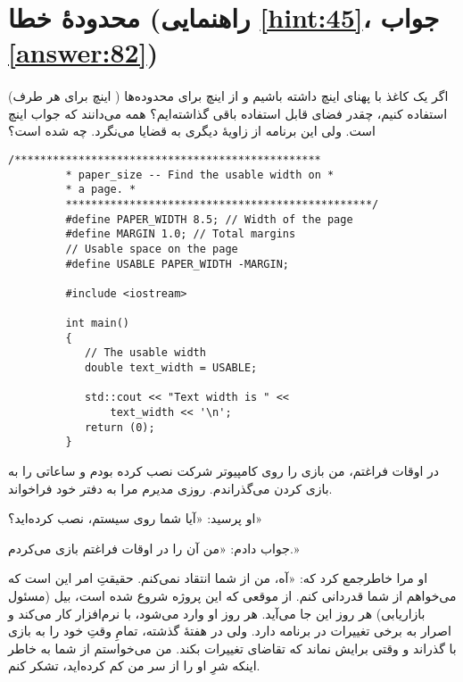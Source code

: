 \section[محدودهٔ خطا]{محدودهٔ خطا \protect{} (راهنمایی \ref{hint:45}، جواب \ref{answer:82})}
\paragraph{}\label{prog:78}
اگر یک کاغذ با پهنای  اینچ داشته باشیم و از  اینچ برای محدوده‌ها ( اینچ برای هر طرف) استفاده کنیم، چقدر فضای قابل استفاده باقی گذاشته‌ایم؟ همه می‌دانند که جواب  اینچ است. ولی این برنامه از زاویهٔ دیگری به قضایا می‌نگرد. چه شده است؟

\begin{LTR}
    \begin{lstlisting}[style=C++Style]
         /************************************************
         * paper_size -- Find the usable width on *
         * a page. *
         ************************************************/
         #define PAPER_WIDTH 8.5; // Width of the page
         #define MARGIN 1.0; // Total margins
         // Usable space on the page
         #define USABLE PAPER_WIDTH -MARGIN;

         #include <iostream>

         int main()
         {
         	// The usable width
         	double text_width = USABLE;

         	std::cout << "Text width is " <<
         		text_width << '\n';
         	return (0);
         }
    \end{lstlisting}
\end{LTR}

\begin{tcolorbox}
    در اوقات فراغتم، من بازی  را روی کامپیوتر شرکت نصب کرده بودم و ساعاتی را به بازی کردن می‌گذراندم. روزی مدیرم مرا به دفتر خود فراخواند.

    او پرسید: «آیا شما روی سیستم،  نصب کرده‌اید؟»

    جواب دادم: «من آن را در اوقات فراغتم بازی می‌کردم.»

    او مرا خاطرجمع کرد که: «آه، من از شما انتقاد نمی‌کنم. حقیقتِ امر این است که می‌خواهم از شما قدردانی کنم. از موقعی که این پروژه شروع شده است، بیل (مسئول بازاریابی) هر روز این جا می‌آید. هر روز او وارد می‌شود، با نرم‌افزار کار می‌کند و اصرار به برخی تغییرات در برنامه دارد. ولی در هفتهٔ گذشته، تمامِ وقتِ خود را به بازی با  گذراند و وقتی برایش نماند که تقاضای تغییرات بکند. من می‌خواستم از شما به خاطر اینکه شرِ او را از سر من کم کرده‌اید، تشکر کنم.
\end{tcolorbox}